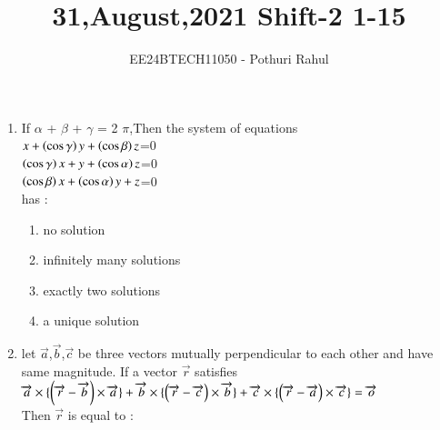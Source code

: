 \documentclass[journal]{IEEEtran}
\begin{document}

\vspace{3cm}
\title{31,August,2021 Shift-2 1-15}
\author{EE24BTECH11050 - Pothuri Rahul}
{\let\newpage\relax\maketitle}
\renewcommand{\thefigure}{\theenumi}
\renewcommand{\thetable}{\theenumi}
\setlength{\intextsep}{10pt} %
\renewcommand{\thetable}{\theenumi}
\begin{enumerate}[start=1]
\item %
If $\alpha$ + $\beta$ + $\gamma$ = 2 $\pi$,Then the system of equations \\
$x+\left(\cos{\gamma}\right)y+\left(\cos{\beta}\right)z$=0 \\
$\left(\cos{\gamma}\right)x+y+\left(\cos{\alpha}\right)z$=0 \\
$\left(\cos{\beta}\right)x+\left(\cos{\alpha}\right)y+z$=0 \\
has :
\begin{enumerate}
\item no solution
\item infinitely many solutions
\item exactly two solutions
\item a unique solution
\end{enumerate}
\item %
let $\overrightarrow{a}$,$\overrightarrow{b}$,$\overrightarrow{c}$ be three vectors mutually perpendicular to each other and have same magnitude. If a vector $\overrightarrow{r}$ satisfies \\
$\overrightarrow{a} \times \{\left(\overrightarrow{r}-\overrightarrow{b}\right)\times\overrightarrow{a}\}+\overrightarrow{b} \times \{\left(\overrightarrow{r}-\overrightarrow{c}\right)\times\overrightarrow{b}\}+\overrightarrow{c} \times \{\left(\overrightarrow{r}-\overrightarrow{a}\right)\times\overrightarrow{c}\} = \overrightarrow{o}$ \\
Then $\overrightarrow{r}$ is equal to : \\
\begin{enumerate}
\end{enumerate}
\end{enumerate}
\end{document}
